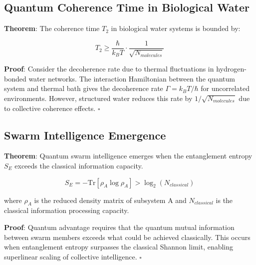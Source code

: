 \documentclass[11pt,a4paper]{article}
\begin{document}
\subsection{Quantum Coherence Time in Biological Water}

\textbf{Theorem}: The coherence time $T_2$ in biological water systems is bounded by:

\begin{equation}
T_2 \geq \frac{\hbar}{k_B T} \cdot \frac{1}{\sqrt{N_{molecules}}}
\end{equation}

\textbf{Proof}: Consider the decoherence rate due to thermal fluctuations in hydrogen-bonded water networks. The interaction Hamiltonian between the quantum system and thermal bath gives the decoherence rate $\Gamma = k_B T/\hbar$ for uncorrelated environments. However, structured water reduces this rate by $1/\sqrt{N_{molecules}}$ due to collective coherence effects. $\square$

\subsection{Swarm Intelligence Emergence}

\textbf{Theorem}: Quantum swarm intelligence emerges when the entanglement entropy $S_E$ exceeds the classical information capacity.

\begin{equation}
S_E = -\text{Tr}[\rho_A \log \rho_A] > \log_2(N_{classical})
\end{equation}

where $\rho_A$ is the reduced density matrix of subsystem A and $N_{classical}$ is the classical information processing capacity.

\textbf{Proof}: Quantum advantage requires that the quantum mutual information between swarm members exceeds what could be achieved classically. This occurs when entanglement entropy surpasses the classical Shannon limit, enabling superlinear scaling of collective intelligence. $\square$
\end{document}

